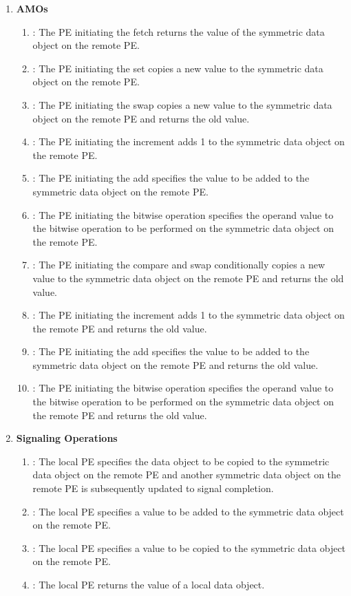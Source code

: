 \begin{enumerate}
\item \textbf{\acfp{AMO}}
\begin{enumerate}
  \item {}: The \ac{PE} initiating the fetch returns the value of the
      symmetric data object on the remote \ac{PE}.
  \item {}: The \ac{PE} initiating the set copies a new value to the
      symmetric data object on the remote \ac{PE}.
  \item {}: The \ac{PE} initiating the swap copies a new value to the
      symmetric data object on the remote \ac{PE} and returns the old value.
  \item {}: The \ac{PE} initiating the increment adds 1 to the
      symmetric data object on the remote \ac{PE}.
  \item {}: The \ac{PE} initiating the add specifies the value to be added
      to the symmetric data object on the remote \ac{PE}.
  \item {}: The \ac{PE} initiating the bitwise
      operation specifies the operand value to the bitwise operation to be
      performed on the symmetric data object on the remote \ac{PE}.
  \item {}: The \ac{PE} initiating the compare and swap
      conditionally copies a new value to the symmetric data object on the
      remote \ac{PE} and returns the old value.
  \item {}: The \ac{PE} initiating the increment adds 1
      to the symmetric data object on the remote \ac{PE} and returns the old
      value.
  \item {}: The \ac{PE} initiating the add specifies the value to
      be added to the symmetric data object on the remote \ac{PE} and returns
      the old value.
  \item {}: The \ac{PE} initiating the bitwise
      operation specifies the operand value to the bitwise operation to be
      performed on the symmetric data object on the remote \ac{PE}
      and returns the old value.
\end{enumerate}

\item \textbf{Signaling Operations}
\begin{enumerate}
  \item {}: The local \ac{PE} specifies the \source{} data object
      to be copied to the symmetric data object on the remote \ac{PE} and
      another symmetric data object on the remote \ac{PE} is subsequently
      updated to signal completion.
  \item {}: The local \ac{PE} specifies a value to be added to
      the symmetric data object on the remote \ac{PE}.
  \item {}: The local \ac{PE} specifies a value to be copied to
      the symmetric data object on the remote \ac{PE}.
  \item {}: The local \ac{PE} returns the value of a local data
      object.
\end{enumerate}


\end{enumerate}

